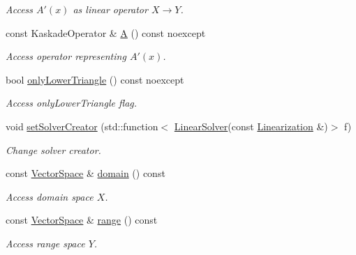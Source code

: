 \begin{DoxyCompactItemize}
\begin{DoxyCompactList}\small\item\em Access $A'(x)$ as linear operator $X\rightarrow Y$. \end{DoxyCompactList}\item 
\hypertarget{classSpacy_1_1Kaskade_1_1C1Operator_ab050915a62f3f8bf25e78af1e1289cb8}{const Kaskade\-Operator \& \hyperlink{classSpacy_1_1Kaskade_1_1C1Operator_ab050915a62f3f8bf25e78af1e1289cb8}{A} () const noexcept}\label{classSpacy_1_1Kaskade_1_1C1Operator_ab050915a62f3f8bf25e78af1e1289cb8}

\begin{DoxyCompactList}\small\item\em Access operator representing $A'(x)$. \end{DoxyCompactList}\item 
bool \hyperlink{classSpacy_1_1Kaskade_1_1C1Operator_adb85b50e1cc87fb342412560353c2f73}{only\-Lower\-Triangle} () const noexcept
\begin{DoxyCompactList}\small\item\em Access only\-Lower\-Triangle flag. \end{DoxyCompactList}\item 
void \hyperlink{classSpacy_1_1Kaskade_1_1C1Operator_aa0c69955542db6b0f61807181874b4d9}{set\-Solver\-Creator} (std\-::function$<$ \hyperlink{namespaceSpacy_adcd0d78166a9c972b8a2e5a689fc2d03}{Linear\-Solver}(const \hyperlink{classSpacy_1_1Kaskade_1_1LinearOperator}{Linearization} \&)$>$ f)
\begin{DoxyCompactList}\small\item\em Change solver creator. \end{DoxyCompactList}\item 
\hypertarget{classSpacy_1_1OperatorBase_a2588f9b3e0188820c4c494e63293dc6f}{const \hyperlink{classSpacy_1_1VectorSpace}{Vector\-Space} \& \hyperlink{classSpacy_1_1OperatorBase_a2588f9b3e0188820c4c494e63293dc6f}{domain} () const }\label{classSpacy_1_1OperatorBase_a2588f9b3e0188820c4c494e63293dc6f}

\begin{DoxyCompactList}\small\item\em Access domain space $X$. \end{DoxyCompactList}\item 
\hypertarget{classSpacy_1_1OperatorBase_ab19d3b7a6f290b1079248f1e567e53d6}{const \hyperlink{classSpacy_1_1VectorSpace}{Vector\-Space} \& \hyperlink{classSpacy_1_1OperatorBase_ab19d3b7a6f290b1079248f1e567e53d6}{range} () const }\label{classSpacy_1_1OperatorBase_ab19d3b7a6f290b1079248f1e567e53d6}

\begin{DoxyCompactList}\small\item\em Access range space $Y$. \end{DoxyCompactList}\end{DoxyCompactItemize}
